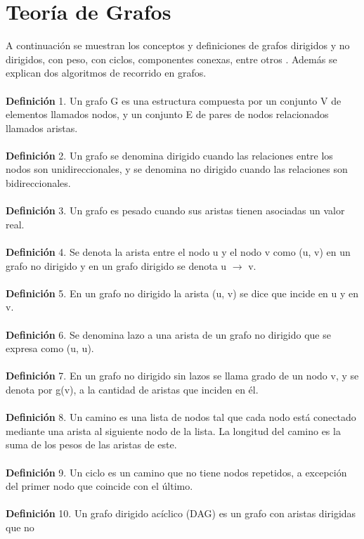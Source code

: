 \documentclass{report}
\begin{document}
\section{Teor\'ia de Grafos}
A continuaci\'on se muestran los conceptos y definiciones de grafos dirigidos y no dirigidos, con
peso, con ciclos, componentes conexas, entre otros \cite{Cormen}\cite{Halim}\cite{Graph1}\cite{Graph2}. Adem\'as se explican dos algoritmos
de recorrido en grafos.\\\\
{\bf Definici\'on} 1. Un grafo G es una estructura compuesta por un conjunto V de elementos llamados nodos, y un conjunto E de pares de nodos relacionados llamados aristas.\\\\
{\bf Definici\'on} 2. Un grafo se denomina dirigido cuando las relaciones entre los nodos son unidireccionales, y se denomina no dirigido cuando las relaciones son bidireccionales.\\\\
{\bf Definici\'on} 3. Un grafo es pesado cuando sus aristas tienen asociadas un valor real.\\\\
{\bf Definici\'on} 4. Se denota la arista entre el nodo u y el nodo v como (u, v) en un grafo no dirigido
y en un grafo dirigido se denota u $\rightarrow$ v.\\\\
{\bf Definici\'on} 5. En un grafo no dirigido la arista (u, v) se dice que incide en u y en v.\\\\
{\bf Definici\'on} 6. Se denomina lazo a una arista de un grafo no dirigido que se expresa como (u, u).\\\\
{\bf Definici\'on} 7. En un grafo no dirigido sin lazos se llama grado de un nodo v, y se denota por
g(v), a la cantidad de aristas que inciden en \'el.\\\\
{\bf Definici\'on} 8. Un camino es una lista de nodos tal que cada nodo est\'a conectado mediante una
arista al siguiente nodo de la lista. La longitud del camino es la suma de los pesos de las aristas
de este.\\\\
{\bf Definici\'on} 9. Un ciclo es un camino que no tiene nodos repetidos, a excepci\'on del primer nodo
que coincide con el \'ultimo.\\\\
{\bf Definici\'on} 10. Un grafo dirigido ac\'iclico (DAG) es un grafo con aristas dirigidas que no
\end{document}
